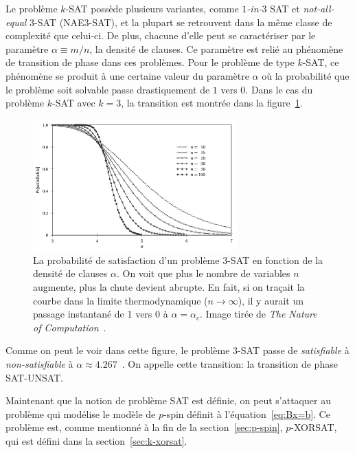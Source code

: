 Le problème $k$-SAT possède plusieurs variantes, comme \textit{$1$-in-$3$} SAT et \textit{not-all-equal} 3-SAT (NAE3-SAT), et la plupart se retrouvent dans la même classe de complexité que celui-ci.
De plus, chacune d'elle peut se caractériser par le paramètre $\alpha \equiv m / n$, la densité de clauses.
Ce paramètre est relié au phénomène de transition de phase dans ces problèmes.
Pour le problème de type $k$-SAT, ce phénomène se produit à une certaine valeur du paramètre $\alpha$ où la probabilité que le problème soit solvable passe drastiquement de $1$ vers $0$.
Dans le cas du problème $k$-SAT avec $k = 3$, la transition est montrée dans la figure~\ref{fig:SAT_phase-transition}.
\begin{figure}[h]
    \centering
    \includegraphics[width=0.7\textwidth]{Figures/SAT_phase-transition.png}
    \caption[La probabilité de satisfaction d'un problème $3$-SAT en fonction de la densité de clauses $\alpha$.]{La probabilité de satisfaction d'un problème $3$-SAT en fonction de la densité de clauses $\alpha$. On voit que plus le nombre de variables $n$ augmente, plus la chute devient abrupte. En fait, si on traçait la courbe dans la limite thermodynamique ($n \rightarrow \infty$), il y aurait un passage instantané de 1 vers 0 à $\alpha = \alpha_c$. Image tirée de \emph{The Nature of Computation}~\protect\cite{moore_nature_2011}.}
    \label{fig:SAT_phase-transition}
\end{figure}
Comme on peut le voir dans cette figure, le problème $3$-SAT passe de \textit{satisfiable} à \textit{non-satisfiable} à $\alpha \approx 4.267$~\cite{moore_nature_2011}.
On appelle cette transition: la transition de phase SAT-UNSAT.

Maintenant que la notion de problème SAT est définie, on peut s'attaquer au problème qui modélise le modèle de $p$-spin définit à l'équation~\ref{eq:Bx=b}.
Ce problème est, comme mentionné à la fin de la section~\ref{sec:p-spin}, $p$-XORSAT, qui est défini dans la section~\ref{sec:k-xorsat}.


